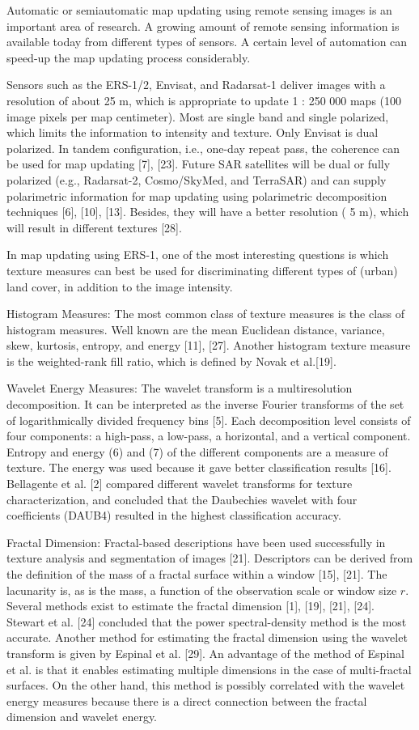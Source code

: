 \documentclass[paper=a4, fontsize=11pt]{scrartcl}
\begin{document}
Automatic or semiautomatic map updating using remote sensing images is an important area of research. 
A growing amount of remote sensing information is available today from different types of sensors. 
A certain level of automation can speed-up the map updating process considerably.

Sensors such as the ERS-1/2, Envisat, and Radarsat-1 deliver images with a resolution of about 25 m, which is appropriate to update 1 : 250 000 maps (100 image pixels per map centimeter). 
Most are single band and single polarized, which limits the information to intensity and texture. 
Only Envisat is dual polarized.
In tandem configuration, i.e., one-day repeat pass, the coherence can be used for map updating [7], [23].
Future SAR satellites will be dual or fully polarized (e.g., Radarsat-2, Cosmo/SkyMed, and TerraSAR) and can supply polarimetric information for map updating using polarimetric decomposition techniques [6], [10], [13]. 
Besides, they will have a better resolution ( 5 m), which will result in different textures [28].

In map updating using ERS-1, one of the most interesting questions is which texture measures can best be used for discriminating different types of (urban) land cover, in addition to the image intensity.

Histogram Measures: The most common class of texture measures is the class of histogram measures. 
Well known are the mean Euclidean distance, variance, skew, kurtosis, entropy, and energy [11], [27].
Another histogram texture measure is the weighted-rank fill ratio, which is defined by Novak et al.[19].

Wavelet Energy Measures: The wavelet transform is a multiresolution decomposition. 
It can be interpreted as the inverse Fourier transforms of the set of logarithmically divided frequency bins [5]. 
Each decomposition level consists of four components: a high-pass, a low-pass, a horizontal, and a vertical component.
Entropy and energy (6) and (7) of the different components are a measure of texture. 
The energy was used because it gave better classification results [16].
Bellagente et al. [2] compared different wavelet transforms for texture characterization, and concluded that the Daubechies wavelet with four coefficients (DAUB4) resulted in the highest classification accuracy.

Fractal Dimension: Fractal-based descriptions have been used successfully in texture analysis and segmentation of images [21]. 
Descriptors can be derived from the definition of the mass of a fractal surface within a window [15], [21].
The lacunarity is, as is the mass, a function of the observation scale or window size $r$.
Several methods exist to estimate the fractal dimension [1], [19], [21], [24]. 
Stewart et al. [24] concluded that the power spectral-density method is the most accurate.
Another method for estimating the fractal dimension using the wavelet transform is given by Espinal et al. [29].
An advantage of the method of Espinal et al. is that it enables estimating multiple dimensions in the case of multi-fractal surfaces. 
On the other hand, this method is possibly correlated with the wavelet energy measures because there is a direct connection between the fractal dimension and wavelet energy.
\end{document}

